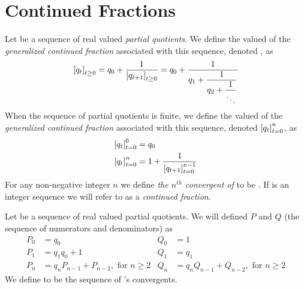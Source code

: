     \section{Continued Fractions}
        \begin{definition}
            Let  be a sequence of real valued \emph{partial quotients}. We
            define the valued of the \emph{generalized continued fraction} associated with this sequence,
            denoted , as
            \begin{equation}
                \left[ q_t \right]_{t \ge 0} = q_0 + \frac{1}{\left[ q_{t + 1} \right]_{t \ge 0}}
                                  = q_0 + \dfrac{1}{
                                            q_1 + \dfrac{1}{
                                                q_2 + \dfrac{1}{\ddots}
                                            }
                                          }
            \end{equation}
            When the sequence of partial quotients is finite, we define the valued of the \emph{
            generalized continued fraction} associated with this sequence, denoted $\left[ q_t \right]_{t = 0}^{n}$,
            as
            \begin{align}
                \left[ q_t \right]_{t = 0}^{0} &= q_0 \\
                \left[ q_t \right]_{t = 0}^{n} &= 1 + \frac{1}{\left[ q_{t + 1} \right]_{t = 0}^{n - 1}}
            \end{align}
            For any non-negative integer $n$ we define \emph{the $n^{th}$ convergent of
            } to be . If  is an integer
            sequence we will refer to  as a \emph{continued fraction}.
            \label{Gen. Cont. Frac.}
        \end{definition}
        \begin{definition}
            Let  be a sequence of real valued partial quotients.
            We will defined $P$ and $Q$ (the sequence of numerators and denominators) as
            \begin{align*}
                P_0 &= q_0 & Q_0 &= 1 \\
                P_1 &= q_1q_0 + 1 & Q_1 &= q_1\\
                P_n &= q_n P_{n - 1} + P_{n - 2}, \mbox{ for $n \ge 2$} &
                Q_n &= q_n Q_{n - 1} + Q_{n - 2}, \mbox{ for $n \ge 2$}
            \end{align*}
            We define  to be the sequence of 's
            convergents.
            \label{Computing Convergents}
        \end{definition}
